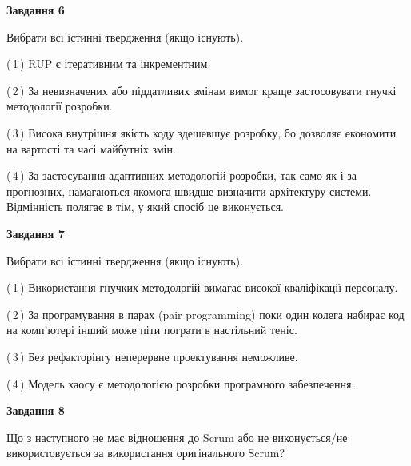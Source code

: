 \documentclass[10pt, ukrainian]{article}
\begin{document}
{\begin {large}
\newpage

{\begin {center}\textbf{Завдання 6}\end {center}}\par
Вибрати всі істинні твердження (якщо існують).\par
\vspace{2mm}



(\,1\,) RUP є ітеративним та інкрементним.%



(\,2\,) За невизначених або піддатливих змінам вимог краще застосовувати гнучкі методології розробки. %



(\,3\,) Висока внутрішня якість коду здешевшує розробку, бо дозволяє економити на вартості та часі майбутніх змін. %



(\,4\,) За застосування адаптивних методологій розробки, так само як і за прогнозних, намагаються якомога швидше визначити архітектуру системи. Відмінність полягає в тім, у який спосіб це виконується.%


{\begin {center}\textbf{Завдання 7}\end {center}}\par
Вибрати всі істинні твердження (якщо існують).\par
\vspace{2mm}



(\,1\,) Використання гнучких методологій вимагає високої кваліфікації персоналу. %



(\,2\,) За програмування в парах (pair programming) поки один колега набирає код на комп'ютері інший може піти пограти в настільний теніс. %



(\,3\,) Без рефакторінгу неперервне проектування неможливе. %



(\,4\,) Модель хаосу є методологією розробки програмного забезпечення. %


{\begin {center}\textbf{Завдання 8}\end {center}}\par
Що з наступного не має відношення до Scrum або не виконується/не використовується за використання оригінального Scrum?\par
\vspace{2mm}




\end{large}}
\end{document}
